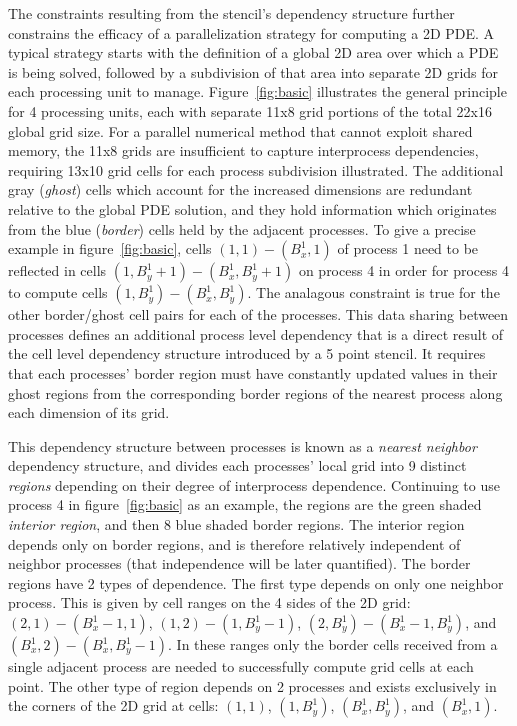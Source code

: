 The constraints resulting from the stencil's dependency structure
further constrains the efficacy of a
parallelization strategy for computing a 2D PDE.  A typical
strategy starts with the definition of a global 2D area over which
a PDE is being solved, followed by a subdivision of that area
into separate 2D grids for each
processing unit to manage.  Figure~\ref{fig:basic} illustrates the general principle for
4 processing units, each with separate
11x8 grid portions of the total 22x16 global grid size.
For a parallel numerical method that cannot exploit shared memory,
the 11x8 grids are insufficient to capture interprocess
dependencies, requiring
13x10 grid cells for each process subdivision illustrated.
The additional gray ({\it ghost}) cells which account for the increased
dimensions are redundant relative to the global PDE solution, and they
hold information which originates from the blue ({\it border}) cells
held by the adjacent processes.  To give a precise example in
figure~\ref{fig:basic},
cells $(1,1) - (B_x^1,1)$ of process 1 need to be
reflected in cells $(1,B_y^1+1) - (B_x^1, B_y^1+1)$ on process 4 in order
for process 4 to compute cells $(1,B_y^1) - (B_x^1, B_y^1)$.  The analagous
constraint is true for the other border/ghost cell pairs for each of the
processes.
This data sharing between processes defines an additional process level
 dependency that is a direct
  result of the cell level dependency structure introduced by a 5 point
  stencil.  It requires that each processes' border
  region must have constantly updated values
  in their ghost regions from the corresponding
 border regions of the nearest process along each dimension of its grid.

This dependency structure between processes is known as a
{\it nearest neighbor} dependency structure, and divides
each processes' local grid into 9 distinct {\it regions} depending on
their degree of interprocess dependence.  Continuing to use process 4
in figure~\ref{fig:basic} as an example, the
regions are the green
shaded {\it interior region}, and then 8 blue shaded border regions.  The interior region depends only on border
regions, and is therefore relatively independent of neighbor processes (that independence will be later quantified).
The border regions have 2 types of dependence.  The first type depends on only one neighbor process.  This is
given by cell ranges on the 4 sides of the 2D grid: $(2,1) - (B_x^1 - 1, 1)$, $(1,2) - (1,B_y^1 - 1)$,
$(2,B_y^1) - (B_x^1 - 1, B_y^1)$, and $(B_x^1,2) - (B_x^1,B_y^1 - 1)$.  In these ranges only the
border cells received from a single adjacent process are
needed to successfully compute grid cells at each point.  The other type of
region depends on 2 processes and exists exclusively
in the corners of the 2D grid at cells: $(1,1)$, $(1,B_y^1)$, $(B_x^1,B_y^1)$,
and $(B_x^1,1)$.

